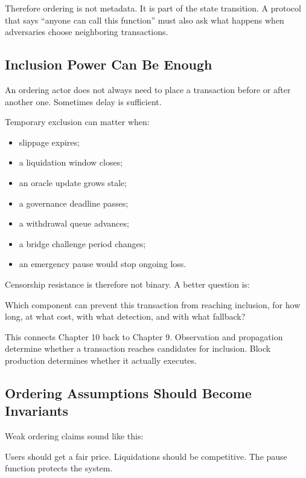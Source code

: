 Therefore ordering is not metadata. It is part of the state transition. A protocol that says ``anyone can call this function'' must also ask what happens when adversaries choose neighboring transactions.

\subsection{Inclusion Power Can Be Enough}

An ordering actor does not always need to place a transaction before or after another one. Sometimes delay is sufficient.

Temporary exclusion can matter when:

\begin{itemize}
\item slippage expires;
\item a liquidation window closes;
\item an oracle update grows stale;
\item a governance deadline passes;
\item a withdrawal queue advances;
\item a bridge challenge period changes;
\item an emergency pause would stop ongoing loss.
\end{itemize}

Censorship resistance is therefore not binary. A better question is:

\begin{codeblock}
Which component can prevent this transaction from reaching inclusion,
for how long, at what cost, with what detection, and with what fallback?
\end{codeblock}

This connects Chapter 10 back to Chapter 9. Observation and propagation determine whether a transaction reaches candidates for inclusion. Block production determines whether it actually executes.

\subsection{Ordering Assumptions Should Become Invariants}

Weak ordering claims sound like this:

\begin{codeblock}
Users should get a fair price.
Liquidations should be competitive.
The pause function protects the system.
\end{codeblock}

